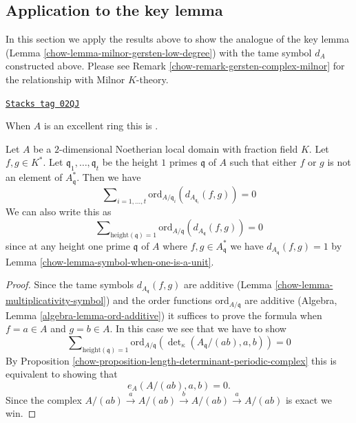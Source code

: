 \subsection{Application to the key lemma}
\label{chow-subsection-application-tame-symbol}

In this section we apply the results above to show the
analogue of the key lemma (Lemma \ref{chow-lemma-milnor-gersten-low-degree})
with the tame symbol $d_A$ constructed above. Please
see Remark \ref{chow-remark-gersten-complex-milnor}
for the relationship with Milnor $K$-theory.

\begin{lemma}

\label{chow-lemma-secondary-ramification}
\href{https://stacks.math.columbia.edu/tag/02QJ}{\texttt{Stacks tag 02QJ}}

\begin{reference}
When $A$ is an excellent ring this is \cite[Proposition 1]{Kato-Milnor-K}.
\end{reference}
Let $A$ be a $2$-dimensional Noetherian local domain with fraction field $K$.
Let $f, g \in K^*$.
Let $\mathfrak q_1, \ldots, \mathfrak q_t$ be the height
$1$ primes $\mathfrak q$ of $A$ such that either $f$ or $g$ is not an
element of $A^*_{\mathfrak q}$.
Then we have
$$
\sum\nolimits_{i = 1, \ldots, t}
\text{ord}_{A/\mathfrak q_i}(d_{A_{\mathfrak q_i}}(f, g))
=
0
$$
We can also write this as
$$
\sum\nolimits_{\text{height}(\mathfrak q) = 1}
\text{ord}_{A/\mathfrak q}(d_{A_{\mathfrak q}}(f, g))
=
0
$$
since at any height one prime $\mathfrak q$
of $A$ where $f, g \in A^*_{\mathfrak q}$
we have $d_{A_{\mathfrak q}}(f, g) = 1$ by
Lemma \ref{chow-lemma-symbol-when-one-is-a-unit}.
\end{lemma}

\begin{proof}

Since the tame symbols $d_{A_{\mathfrak q}}(f, g)$ are additive
(Lemma \ref{chow-lemma-multiplicativity-symbol}) and the order
functions $\text{ord}_{A/\mathfrak q}$
are additive (Algebra, Lemma \ref{algebra-lemma-ord-additive})
it suffices to prove the formula when $f = a \in A$ and
$g = b \in A$. In this case we see that we have to show
$$
\sum\nolimits_{\text{height}(\mathfrak q) = 1}
\text{ord}_{A/\mathfrak q}(\det\nolimits_\kappa(A_{\mathfrak q}/(ab), a, b))
= 0
$$
By Proposition \ref{chow-proposition-length-determinant-periodic-complex}
this is equivalent to showing that
$$
e_A(A/(ab), a, b) = 0.
$$
Since the complex
$A/(ab) \xrightarrow{a} A/(ab) \xrightarrow{b} A/(ab) \xrightarrow{a} A/(ab)$
is exact we win.
\end{proof}

